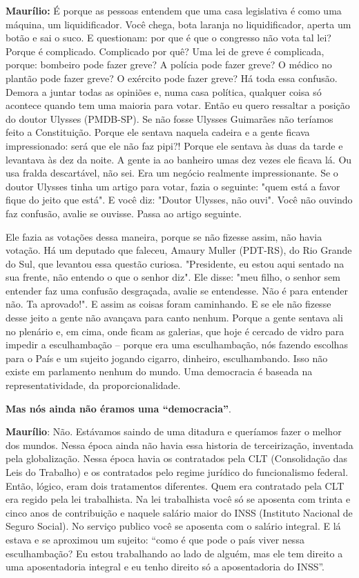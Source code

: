 \textbf{Maurílio:} É porque as pessoas entendem que uma casa legislativa
é como uma máquina, um liquidificador. Você chega, bota laranja no
liquidificador, aperta um botão e sai o suco. E questionam: por que é
que o congresso não vota tal lei? Porque é complicado. Complicado por
quê? Uma lei de greve é complicada, porque: bombeiro pode fazer greve? A
polícia pode fazer greve? O médico no plantão pode fazer greve? O
exército pode fazer greve? Há toda essa confusão. Demora a juntar todas
as opiniões e, numa casa política, qualquer coisa só acontece quando tem
uma maioria para votar. Então eu quero ressaltar a posição do doutor
Ulysses (PMDB-SP). Se não fosse Ulysses Guimarães não teríamos feito a
Constituição. Porque ele sentava naquela cadeira e a gente ficava
impressionado: será que ele não faz pipi?! Porque ele sentava às duas da
tarde e levantava às dez da noite. A gente ia ao banheiro umas dez vezes
ele ficava lá. Ou usa fralda descartável, não sei. Era um negócio
realmente impressionante. Se o doutor Ulysses tinha um artigo para
votar, fazia o seguinte: "quem está a favor fique do jeito que está". E
você diz: "Doutor Ulysses, não ouvi". Você não ouvindo faz confusão,
avalie se ouvisse. Passa ao artigo seguinte.

Ele fazia as votações dessa maneira, porque se não fizesse assim, não
havia votação. Há um deputado que faleceu, Amaury Muller (PDT-RS), do
Rio Grande do Sul, que levantou essa questão curiosa. "Presidente, eu
estou aqui sentado na sua frente, não entendo o que o senhor diz". Ele
disse: "meu filho, o senhor sem entender faz uma confusão desgraçada,
avalie se entendesse. Não é para entender não. Ta aprovado!". E assim as
coisas foram caminhando. E se ele não fizesse desse jeito a gente não
avançava para canto nenhum. Porque a gente sentava ali no plenário e, em
cima, onde ficam as galerias, que hoje é cercado de vidro para impedir a
esculhambação -- porque era uma esculhambação, nós fazendo escolhas para
o País e um sujeito jogando cigarro, dinheiro, esculhambando. Isso não
existe em parlamento nenhum do mundo. Uma democracia é baseada na
representatividade, da proporcionalidade.

\textbf{Mas nós ainda não éramos uma ``democracia''}.

\textbf{Maurílio}: Não. Estávamos saindo de uma ditadura e queríamos
fazer o melhor dos mundos. Nessa época ainda não havia essa historia de
terceirização, inventada pela globalização. Nessa época havia os
contratados pela CLT (Consolidação das Leis do Trabalho) e os
contratados pelo regime jurídico do funcionalismo federal. Então,
lógico, eram dois tratamentos diferentes. Quem era contratado pela CLT
era regido pela lei trabalhista. Na lei trabalhista você só se aposenta
com trinta e cinco anos de contribuição e naquele salário maior do INSS
(Instituto Nacional de Seguro Social). No serviço publico você se
aposenta com o salário integral. E lá estava e se aproximou um sujeito:
``como é que pode o país viver nessa esculhambação? Eu estou trabalhando
ao lado de alguém, mas ele tem direito a uma aposentadoria integral e eu
tenho direito só a aposentadoria do INSS''.


